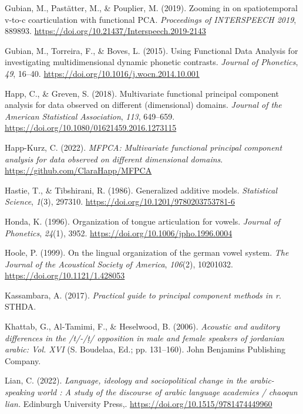 \documentclass[
  man,
  longtable,
  nolmodern,
  notxfonts,
  notimes,
  colorlinks=true,linkcolor=blue,citecolor=blue,urlcolor=blue]{apa7}
\newlength{\cslhangindent}
\newenvironment{CSLReferences}[2] %
 {\begin{list}{}{%
  \setlength{\itemindent}{0pt}
  \setlength{\leftmargin}{0pt}
  \setlength{\parsep}{0pt}
  \ifodd #1
   \setlength{\leftmargin}{\cslhangindent}
   \setlength{\itemindent}{-1\cslhangindent}
  \fi
  \setlength{\itemsep}{#2\baselineskip}}}
 {\end{list}}
\begin{document}
\begin{CSLReferences}{1}{0}
Gubian, M., Pastätter, M., \& Pouplier, M. (2019). Zooming in on
spatiotemporal v-to-c coarticulation with functional PCA.
\emph{Proceedings of INTERSPEECH 2019}, 889893.
\url{https://doi.org/10.21437/Interspeech.2019-2143}

Gubian, M., Torreira, F., \& Boves, L. (2015). Using Functional Data
Analysis for investigating multidimensional dynamic phonetic contrasts.
\emph{Journal of Phonetics}, \emph{49}, 16--40.
\url{https://doi.org/10.1016/j.wocn.2014.10.001}

Happ, C., \& Greven, S. (2018). Multivariate functional principal
component analysis for data observed on different (dimensional) domains.
\emph{Journal of the American Statistical Association}, \emph{113},
649--659. \url{https://doi.org/10.1080/01621459.2016.1273115}

Happ-Kurz, C. (2022). \emph{MFPCA: Multivariate functional principal
component analysis for data observed on different dimensional domains}.
\url{https://github.com/ClaraHapp/MFPCA}

Hastie, T., \& Tibshirani, R. (1986). Generalized additive models.
\emph{Statistical Science}, \emph{1}(3), 297310.
\url{https://doi.org/10.1201/9780203753781-6}

Honda, K. (1996). Organization of tongue articulation for vowels.
\emph{Journal of Phonetics}, \emph{24}(1), 3952.
\url{https://doi.org/10.1006/jpho.1996.0004}

Hoole, P. (1999). On the lingual organization of the german vowel
system. \emph{The Journal of the Acoustical Society of America},
\emph{106}(2), 10201032. \url{https://doi.org/10.1121/1.428053}

Kassambara, A. (2017). \emph{Practical guide to principal component
methods in r}. STHDA.

Khattab, G., Al-Tamimi, F., \& Heselwood, B. (2006). \emph{Acoustic and
auditory differences in the /t/-/ṭ/ opposition in male and female
speakers of jordanian arabic: Vol. XVI} (S. Boudelaa, Ed.; pp.
131--160). John Benjamins Publishing Company.

Lian, C. (2022). \emph{Language, ideology and sociopolitical change in
the arabic-speaking world : A study of the discourse of arabic language
academies / chaoqun lian.} Edinburgh University Press,.
\url{https://doi.org/10.1515/9781474449960}


\end{CSLReferences}
\end{document}
